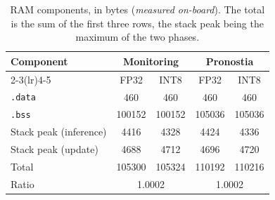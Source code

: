 \begin{table}[htbp]
\centering
\caption{RAM components, in bytes (\emph{measured on-board}). The total is the sum of the first three rows, the stack peak being the maximum of the two phases.}
\label{tab:annex-ram}
\begin{tabular}{lcccc}
\toprule
Component & \multicolumn{2}{c}{Monitoring} & \multicolumn{2}{c}{Pronostia} \\
\cmidrule(lr){2-3}\cmidrule(lr){4-5}
 & FP32 & INT8 & FP32 & INT8 \\
\midrule
\texttt{.data} & \num{460} & \num{460} & \num{460} & \num{460} \\
\texttt{.bss} & \num{100152} & \num{100152} & \num{105036} & \num{105036} \\
Stack peak (inference) & \num{4416} & \num{4328} & \num{4424} & \num{4336} \\
Stack peak (update) & \num{4688} & \num{4712} & \num{4696} & \num{4720} \\
Total & \num{105300} & \num{105324} & \num{110192} & \num{110216} \\
\midrule
Ratio & \multicolumn{2}{c}{\num{1.0002}} & \multicolumn{2}{c}{\num{1.0002}} \\
\bottomrule
\end{tabular}
\end{table}
